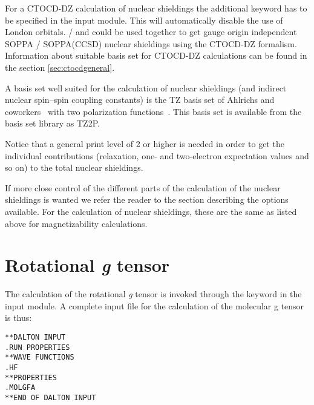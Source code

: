 For a CTOCD-DZ calculation of nuclear shieldings the 
additional keyword  has to be specified in the  
input module. This will automatically disable the use of London orbitals.
 /  and  could be used together to get gauge
origin independent SOPPA / SOPPA(CCSD) nuclear shieldings using the CTOCD-DZ
formalism.  Information about suitable basis set for CTOCD-DZ calculations can
be found in the section \ref{sec:ctocdgeneral}. 

A basis set well suited for the calculation of nuclear shieldings (and
indirect nuclear spin--spin coupling constants) is the TZ basis set of
Ahlrichs and coworkers~\cite{ashhrajcp97,aschrajcp100} with two
polarization functions~\cite{thmjkrcr99}. This basis set is available
from the basis set library as TZ2P.

Notice that a general print level of 2 or higher is needed in order to
get the individual contributions (relaxation, one- and
two-electron expectation values and so on) to the total nuclear shieldings.

If more close control of the different parts of the calculation of the
nuclear shieldings is wanted we refer the reader to the section
describing the options available. For the calculation of nuclear
shieldings, these are the same as listed above for magnetizability
calculations.

\section{Rotational {\em g} tensor}\label{sec:gfac}

\begin{center}
\end{center}

The calculation of the rotational  {\em g} tensor is invoked through the
keyword  in the  input module. A complete
input file for the calculation of the molecular g tensor is thus:

\begin{verbatim}
**DALTON INPUT
.RUN PROPERTIES
**WAVE FUNCTIONS
.HF
**PROPERTIES
.MOLGFA
**END OF DALTON INPUT
\end{verbatim}

